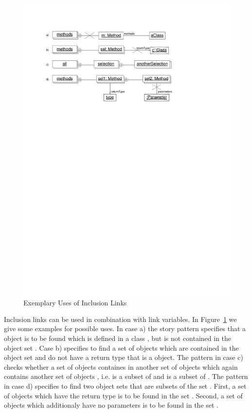 \begin{figure}[htb]
  \centering
  \includegraphics[scale=0.8]{figures/InclusionLinksExamples}
  \caption{Exemplary Uses of Inclusion Links}
  \label{fig:InlucionLinksExamples}
\end{figure}

Inclusion links can be used in combination with link variables.
In Figure~\ref{fig:InlucionLinksExamples} we give some examples for possible uses.
In case a) the story pattern specifies that a  object is to be found which is defined in a class ,
but is not contained in the object set .
Case b) specifies to find a set  of  objects which are contained in the object set 
and do not have a return type that is a  object.
The pattern in case c) checks whether a set of objects  containes in another set of objects 
which again contains another set of objects ,
i.e.  is a subset of  and  is a subset of .
The pattern in case d) specifies to find two object sets that are subsets of the set .
First, a set  of  objects which have the return type  is to be found in the set .
Second, a set  of  objects which additionaly have no parameters is to be found in the set .


